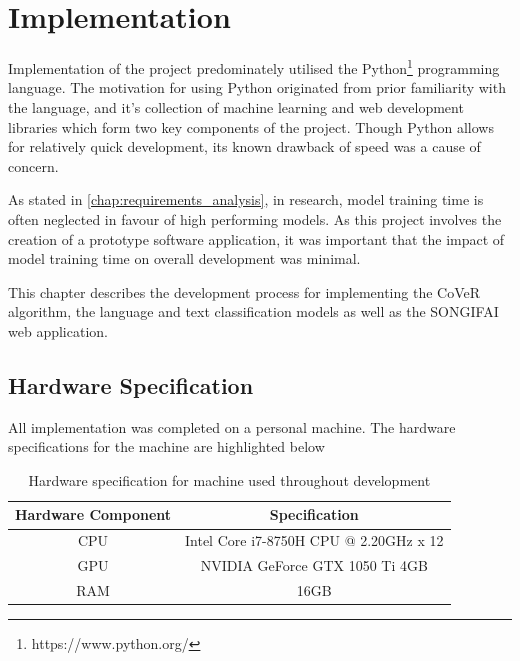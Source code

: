\chapter{Implementation}
\label{chap:implementation}
Implementation of the project predominately utilised the  Python\footnote{https://www.python.org/} programming language. The motivation for using Python originated from prior familiarity with the language, and it's collection of machine learning and web development libraries which form two key components of the project. Though Python allows for relatively quick development, its known drawback of speed was a cause of concern.

\noindent
\newline
As stated in \autoref{chap:requirements_analysis}, in research, model training time is often neglected in favour of high performing models. As this project involves the creation of a prototype software application, it was important that the impact of model training time on overall development was minimal.

\noindent
\newline
This chapter describes the development process for implementing the CoVeR algorithm, the language and text classification models as well as the SONGIFAI web application. 

\section{Hardware Specification}
All implementation was completed on a personal machine. The hardware specifications for the machine are highlighted below

\begin{table}[h!]
	\centering
	\begin{tabular}{||c | c||} 
		\hline
		Hardware Component & Specification \\ [0.5ex] 
		\hline\hline
		CPU & Intel Core i7-8750H CPU @ 2.20GHz x 12 \\ 
		GPU & NVIDIA GeForce GTX 1050 Ti 4GB \\
		RAM & 16GB \\
		\hline
	\end{tabular}
	\caption[Hardware Specification]{Hardware specification for machine used throughout development}
	\label{table:1}
\end{table}
